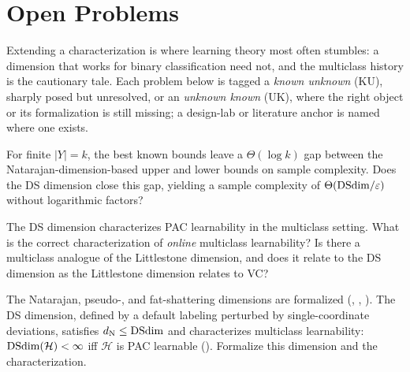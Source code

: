 
\section{Open Problems}
\label{sec:extensions-open}

Extending a characterization is where learning theory most often stumbles: a
dimension that works for binary classification need not, and the multiclass
history is the cautionary tale.  Each problem below is tagged a \emph{known
unknown} (KU), sharply posed but unresolved, or an \emph{unknown known} (UK),
where the right object or its formalization is still missing; a design-lab or
literature anchor is named where one exists.

\begin{openprob}
\label{open:multiclass-tight}
For finite $|Y| = k$, the best known bounds leave a $\Theta(\log k)$ gap
between the Natarajan-dimension-based upper and lower bounds on sample
complexity.  Does the DS dimension close this gap, yielding a sample
complexity of $\Theta(\mathrm{DSdim} / \varepsilon)$ without logarithmic factors?
\end{openprob}

\begin{openprob}
\label{open:multiclass-online}
The DS dimension characterizes PAC learnability in the multiclass setting.
What is the correct characterization of \emph{online} multiclass learnability?
Is there a multiclass analogue of the Littlestone dimension, and does it
relate to the DS dimension as the Littlestone dimension relates to VC?
\end{openprob}

\begin{openprob}
\label{open:formalize-ds}
The Natarajan, pseudo-, and fat-shattering dimensions are formalized
(, , ).
The DS dimension, defined by a default labeling perturbed by single-coordinate
deviations, satisfies $d_{\mathrm{N}} \le \mathrm{DSdim}$ and characterizes multiclass
learnability: $\mathrm{DSdim}(\mathcal{H}) < \infty$ iff $\mathcal{H}$ is PAC learnable
(\cite{BrukhimCarmonDinurMoranYehudayoff2022}).  Formalize this dimension and
the characterization.
\end{openprob}

